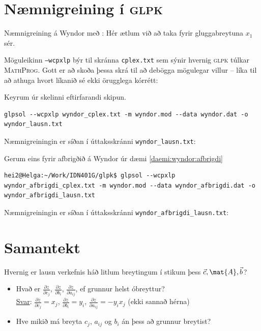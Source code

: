 \section{Næmnigreining í \textsc{glpk}}

\begin{daemi} Næmnigreining á Wyndor með : Hér ætlum við að taka fyrir gluggabreytuna $x_1$ sér.

\begin{samepage}\end{samepage}
\end{daemi}
\newpage
\begin{lausnSYND}
Möguleikinn \texttt{--wcpxlp} býr til skránna \texttt{cplex.txt} sem sýnir hvernig \textsc{glpk} túlkar \textsc{MathProg}. Gott er að skoða þessa skrá til að debögga mögulegar villur -- líka til að athuga hvort líkanið sé ekki örugglega kórrétt:
\lstset{basicstyle=\tiny}
 

Keyrum úr skelinni eftirfarandi skipun.
\begin{lstlisting}
glpsol --wcpxlp wyndor_cplex.txt -m wyndor.mod --data wyndor.dat -o wyndor_lausn.txt 
\end{lstlisting}

Næmnigreiningin er síðan í úttaksskránni \texttt{wyndor\_lausn.txt}:


\newpage
Gerum eins fyrir afbrigðið á Wyndor úr dæmi \ref{daemi:wyndor:afbrigdi}
\begin{lstlisting}
hei2@Helga:~/Work/IDN401G/glpk$ glpsol --wcpxlp wyndor_afbrigdi_cplex.txt -m wyndor.mod --data wyndor_afbrigdi.dat -o wyndor_afbrigdi_lausn.txt 
\end{lstlisting}

Næmnigreiningin er síðan í úttaksskránni \texttt{wyndor\_afbrigdi\_lausn.txt}:


\lstset{basicstyle=\footnotesize}


\end{lausnSYND}
\section{Samantekt}
Hvernig er lausn verkefnis háð litlum breytingum í
stikum þess $\vec{c}, \mat{A}, \vec{b}$?

\begin{itemize}
\item Hvað er $\frac{\partial z}{\partial c_j}$, $\frac{\partial
    z}{\partial b_i}$, $\frac{\partial z}{\partial a_{ij}}$, ef
  grunnur helst óbreyttur?\\
  
  \underline{Svar}: $\frac{\partial z}{\partial c_j}=x_j$,
  $\frac{\partial z}{\partial b_i}= y_i$, $\frac{\partial
    z}{\partial a_{ij}}=-y_ix_j$ (ekki sannað hérna)\\

\item Hve mikið má breyta $c_j$, $a_{ij}$ og $b_i$ án þess að grunnur breytist?
\end{itemize}

